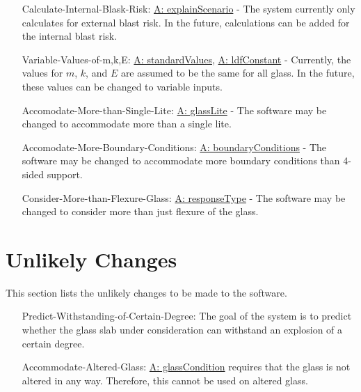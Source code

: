 \documentclass[12pt]{article}
\begin{document}
\begin{itemize}
\item[Calculate-Internal-Blask-Risk:\phantomsection\label{calcInternalBlastRisk}]\hyperref[assumpES]{A: explainScenario} - The system currently only calculates for external blast risk. In the future, calculations can be added for the internal blast risk.
\item[Variable-Values-of-m,k,E:\phantomsection\label{varValsOfmkE}]\hyperref[assumpSV]{A: standardValues}, \hyperref[assumpLDFC]{A: ldfConstant} - Currently, the values for $m$, $k$, and $E$ are assumed to be the same for all glass. In the future, these values can be changed to variable inputs.
\item[Accomodate-More-than-Single-Lite:\phantomsection\label{accMoreThanSingleLite}]\hyperref[assumpGL]{A: glassLite} - The software may be changed to accommodate more than a single lite.
\item[Accomodate-More-Boundary-Conditions:\phantomsection\label{accMoreBoundaryConditions}]\hyperref[assumpBC]{A: boundaryConditions} - The software may be changed to accommodate more boundary conditions than 4-sided support.
\item[Consider-More-than-Flexure-Glass:\phantomsection\label{considerMoreThanFlexGlass}]\hyperref[assumpRT]{A: responseType} - The software may be changed to consider more than just flexure of the glass.
\end{itemize}
\section{Unlikely Changes}
\label{Sec:UCs}
This section lists the unlikely changes to be made to the software.

\begin{itemize}
\item[Predict-Withstanding-of-Certain-Degree:\phantomsection\label{predictWithstandOfCertDeg}]The goal of the system is to predict whether the glass slab under consideration can withstand an explosion of a certain degree.
\item[Accommodate-Altered-Glass:\phantomsection\label{accAlteredGlass}]\hyperref[assumpGC]{A: glassCondition} requires that the glass is not altered in any way. Therefore, this cannot be used on altered glass.
\end{itemize}
\end{document}
